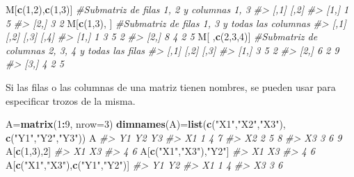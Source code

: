 \documentclass[
]{book}
\newenvironment{Shaded}{\begin{snugshade}}{\end{snugshade}}
\newcommand{\CommentTok}[1]{\textcolor[rgb]{0.56,0.35,0.01}{\textit{#1}}}
\newcommand{\DataTypeTok}[1]{\textcolor[rgb]{0.13,0.29,0.53}{#1}}
\newcommand{\DecValTok}[1]{\textcolor[rgb]{0.00,0.00,0.81}{#1}}
\newcommand{\KeywordTok}[1]{\textcolor[rgb]{0.13,0.29,0.53}{\textbf{#1}}}
\newcommand{\NormalTok}[1]{#1}
\newcommand{\OperatorTok}[1]{\textcolor[rgb]{0.81,0.36,0.00}{\textbf{#1}}}
\newcommand{\StringTok}[1]{\textcolor[rgb]{0.31,0.60,0.02}{#1}}
\theoremstyle{definition}
\theoremstyle{definition}
\theoremstyle{definition}
\theoremstyle{remark}
\begin{document}
\begin{Shaded}
\begin{Highlighting}[]
\NormalTok{M[}\KeywordTok{c}\NormalTok{(}\DecValTok{1}\NormalTok{,}\DecValTok{2}\NormalTok{),}\KeywordTok{c}\NormalTok{(}\DecValTok{1}\NormalTok{,}\DecValTok{3}\NormalTok{)] }\CommentTok{\#Submatriz de filas 1, 2 y columnas 1, 3}
\CommentTok{\#\textgreater{}      [,1] [,2]}
\CommentTok{\#\textgreater{} [1,]    1    5}
\CommentTok{\#\textgreater{} [2,]    3    2}
\NormalTok{M[}\KeywordTok{c}\NormalTok{(}\DecValTok{1}\NormalTok{,}\DecValTok{3}\NormalTok{), ] }\CommentTok{\#Submatriz de filas 1, 3 y todas las columnas}
\CommentTok{\#\textgreater{}      [,1] [,2] [,3] [,4]}
\CommentTok{\#\textgreater{} [1,]    1    3    5    2}
\CommentTok{\#\textgreater{} [2,]    8    4    2    5}
\NormalTok{M[ ,}\KeywordTok{c}\NormalTok{(}\DecValTok{2}\NormalTok{,}\DecValTok{3}\NormalTok{,}\DecValTok{4}\NormalTok{)] }\CommentTok{\#Submatriz de columnas 2, 3, 4 y todas las filas}
\CommentTok{\#\textgreater{}      [,1] [,2] [,3]}
\CommentTok{\#\textgreater{} [1,]    3    5    2}
\CommentTok{\#\textgreater{} [2,]    6    2    9}
\CommentTok{\#\textgreater{} [3,]    4    2    5}
\end{Highlighting}
\end{Shaded}

Si las filas o las columnas de una matriz tienen nombres, se pueden usar para especificar trozos de la misma.

\begin{Shaded}
\begin{Highlighting}[]
\NormalTok{A=}\KeywordTok{matrix}\NormalTok{(}\DecValTok{1}\OperatorTok{:}\DecValTok{9}\NormalTok{, }\DataTypeTok{nrow=}\DecValTok{3}\NormalTok{)}
\KeywordTok{dimnames}\NormalTok{(A)=}\KeywordTok{list}\NormalTok{(}\KeywordTok{c}\NormalTok{(}\StringTok{"X1"}\NormalTok{,}\StringTok{"X2"}\NormalTok{,}\StringTok{"X3"}\NormalTok{), }\KeywordTok{c}\NormalTok{(}\StringTok{"Y1"}\NormalTok{,}\StringTok{"Y2"}\NormalTok{,}\StringTok{"Y3"}\NormalTok{))}
\NormalTok{A}
\CommentTok{\#\textgreater{}    Y1 Y2 Y3}
\CommentTok{\#\textgreater{} X1  1  4  7}
\CommentTok{\#\textgreater{} X2  2  5  8}
\CommentTok{\#\textgreater{} X3  3  6  9}
\NormalTok{A[}\KeywordTok{c}\NormalTok{(}\DecValTok{1}\NormalTok{,}\DecValTok{3}\NormalTok{),}\DecValTok{2}\NormalTok{]}
\CommentTok{\#\textgreater{} X1 X3 }
\CommentTok{\#\textgreater{}  4  6}
\NormalTok{A[}\KeywordTok{c}\NormalTok{(}\StringTok{"X1"}\NormalTok{,}\StringTok{"X3"}\NormalTok{),}\StringTok{"Y2"}\NormalTok{]}
\CommentTok{\#\textgreater{} X1 X3 }
\CommentTok{\#\textgreater{}  4  6}
\NormalTok{A[}\KeywordTok{c}\NormalTok{(}\StringTok{"X1"}\NormalTok{,}\StringTok{"X3"}\NormalTok{),}\KeywordTok{c}\NormalTok{(}\StringTok{"Y1"}\NormalTok{,}\StringTok{"Y2"}\NormalTok{)]}
\CommentTok{\#\textgreater{}    Y1 Y2}
\CommentTok{\#\textgreater{} X1  1  4}
\CommentTok{\#\textgreater{} X3  3  6}
\end{Highlighting}
\end{Shaded}
\end{document}
